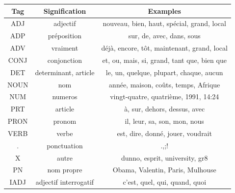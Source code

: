 \documentclass[french,12pt]{article}
\begin{document}
\begin{enumerate}
\begin{tabular}{|c|c|c|}
\hline

Tag & Signification & Examples \\

\hline

ADJ & adjectif & nouveau, bien, haut, spécial, grand, local \\

\hline

ADP & préposition & sur, de, avec, dans, sous \\

\hline

ADV & vraiment & déjà, encore, tôt, maintenant, grand, local \\
\hline

CONJ & conjonction & et, ou, mais, si, grand, tant que, bien que \\
\hline

DET & determinant, article & le, un, quelque, plupart, chaque, aucun \\
\hline

NOUN & nom & année, maison, coûts, temps, Afrique \\
\hline

NUM & numeros & vingt-quatre, quatrième, 1991, 14:24 \\
\hline

PRT & article & à, sur, dehors, dessus, avec \\
\hline

PRON & pronom & il, leur, sa, son, mon, nous \\
\hline

VERB & verbe & est, dire, donné, jouer, voudrait \\
\hline

. & ponctuation & .,;! \\
\hline

X & autre & dunno, esprit, university, gr8 \\
\hline

PN & nom propre & Obama, Valentin, Paris, Mulhouse \\

\hline

IADJ & adjectif interrogatif & c'est, quel, qui, quand, quoi \\

\hline



\end{tabular}


\end{enumerate}
\end{document}
